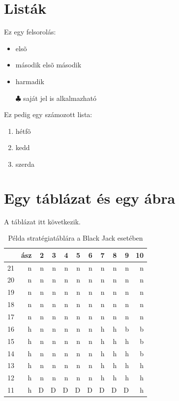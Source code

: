 \documentclass[12pt]{report}
\theoremstyle{definition}
\begin{document}
\section{Listák}

Ez egy felsorolás:
\begin{itemize}
    \item elsõ
    \item második
      \subitem elsõ
      \subitem második
    \item harmadik
    \item[$\clubsuit$]  saját jel is alkalmazható
\end{itemize}
Ez pedig egy számozott lista:
\begin{enumerate}
            \item hétfõ
            \item kedd
            \item szerda
\end{enumerate}

\pagebreak


\section{Egy táblázat és egy ábra}

A táblázat itt következik.
\begin{table}[!h]\label{strategia}
\caption{Példa stratégiatáblára a Black Jack esetében}
\begin{center}
\begin{tabular}{l||r|r|r|r|r|r|r|r|r|r}
&ász&2&3&4&5&6&7&8&9&10\\
\hline\hline
21&n&n&n&n&n&n&n&n&n&n\\
20&n&n&n&n&n&n&n&n&n&n\\
19&n&n&n&n&n&n&n&n&n&n\\
18&n&n&n&n&n&n&n&n&n&n\\
17&n&n&n&n&n&n&n&n&n&n\\
16&h&n&n&n&n&n&h&h&b&b\\
15&h&n&n&n&n&n&h&h&h&b\\
14&h&n&n&n&n&n&h&h&h&b\\
13&h&n&n&n&n&n&h&h&h&h\\
12&h&n&n&n&n&n&h&h&h&h\\
11&h&D&D&D&D&D&D&D&D&h\\
\end{tabular}
\end{center}
\end{table}
\end{document}
